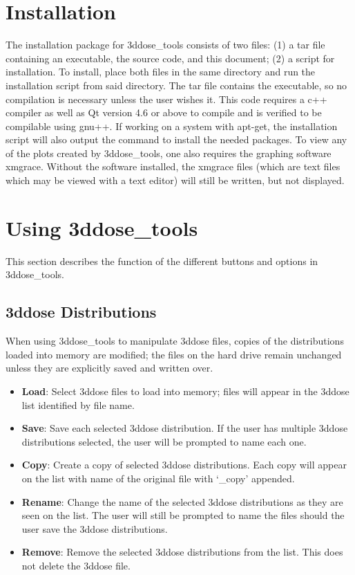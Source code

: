 \documentclass[12pt]{article}
\newcommand{\GUI}{3ddose\_tools}
\begin{document}
  \section{Installation}
  The installation package for \GUI{} consists of two files: (1) a tar file containing an executable, the source code, and this document; (2) a script  for installation.  To install, place both files in the same directory and run the installation script from said directory.
  The tar file contains the executable, so no compilation is necessary unless the user wishes it.  This code requires a c++ compiler as well as Qt version 4.6 or above to compile and is verified to be compilable using gnu++.  If working on a system with apt-get, the installation script will also output the command to install the needed packages.
  To view any of the plots created by \GUI{}, one also requires the graphing software xmgrace.  Without the software installed, the xmgrace files (which are text files which may be viewed with a text editor) will still be written, but not displayed.
 
 \section{Using \GUI{}}
  This section describes the function of the different buttons and options in \GUI{}.
  
  \subsection{3ddose Distributions}
  When using \GUI{} to manipulate 3ddose files, copies of the distributions loaded into memory are modified; the files on the hard drive remain unchanged unless they are explicitly saved and written over.
  
  \begin{itemize}
  \item{\bf{Load}}:  Select 3ddose files to load into memory; files will appear in the 3ddose list identified by file name.

  \item{\bf{Save}}:
  Save each selected 3ddose distribution.  If the user has multiple 3ddose distributions selected, the user will be prompted to name each one.

  \item{\bf{Copy}}:
  Create a copy of selected 3ddose distributions.  Each copy will appear on the list with name of the original file with `\_copy' appended.
  
  \item{\bf{Rename}}:
  Change the name of the selected 3ddose distributions as they are seen on the list.  The user will still be prompted to name the files should the user save the 3ddose distributions.
  
  \item{\bf{Remove}}:
  Remove the selected 3ddose distributions from the list.  This does not delete the 3ddose file.
  \end{itemize}
  
\end{document}
